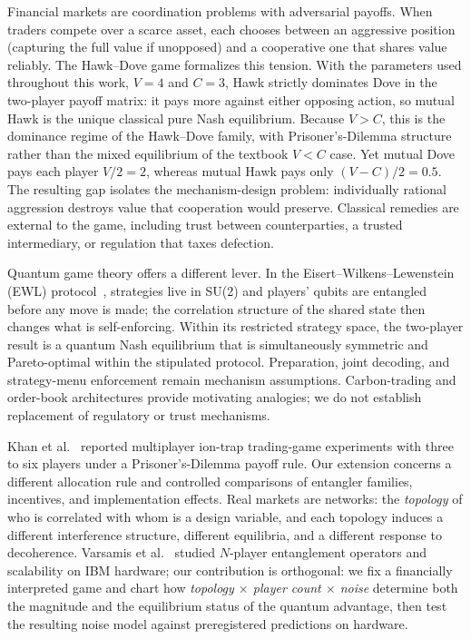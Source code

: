 \documentclass[conference,letterpaper,10pt]{IEEEtran}
\begin{document}
Financial markets are coordination problems with adversarial payoffs. When
traders compete over a scarce asset, each chooses between an aggressive position (capturing the full value if unopposed) and a cooperative one
that shares value reliably. The Hawk--Dove game formalizes this tension. With
the parameters used throughout this work, $V=4$ and $C=3$, Hawk
strictly dominates Dove in the two-player payoff matrix: it pays more against
either opposing action, so mutual Hawk is the unique classical pure Nash
equilibrium. Because $V>C$, this is the dominance regime of the Hawk--Dove
family, with Prisoner's-Dilemma structure rather than the mixed equilibrium of
the textbook $V<C$ case. Yet mutual Dove pays each player $V/2=2$, whereas mutual Hawk pays
only $(V-C)/2=0.5$. The resulting gap isolates the mechanism-design problem:
individually rational aggression destroys value that cooperation would
preserve. Classical remedies are external to the game, including trust between
counterparties, a trusted intermediary, or regulation that taxes defection.

Quantum game theory offers a different lever. In the
Eisert--Wilkens--Lewenstein (EWL) protocol~\cite{eisert1999}, strategies live
in SU(2) and players' qubits are entangled before any move is made; the
correlation structure of the shared state then changes what is
self-enforcing. Within its restricted strategy space, the two-player result is a quantum Nash equilibrium
that is simultaneously symmetric and Pareto-optimal within the stipulated
protocol. Preparation, joint decoding, and strategy-menu enforcement remain
mechanism assumptions. Carbon-trading and order-book architectures provide motivating analogies;
we do not establish replacement of regulatory or trust mechanisms.

Khan et al.~\cite{khan2025} reported multiplayer ion-trap trading-game
experiments with three to six players under a Prisoner's-Dilemma payoff rule.
Our extension concerns a different allocation rule and controlled comparisons
of entangler families, incentives, and implementation effects. Real markets
are networks: the
\emph{topology} of who is correlated with whom is a design variable, and each
topology induces a different interference structure, different equilibria, and
a different response to decoherence. Varsamis et al.~\cite{varsamis2025}
studied $N$-player entanglement operators and scalability on IBM hardware;
our contribution is orthogonal: we fix a financially interpreted game and
chart how \emph{topology $\times$ player count $\times$ noise} determine both
the magnitude and the equilibrium status of the quantum advantage, then test
the resulting noise model against preregistered predictions on hardware.
\end{document}
